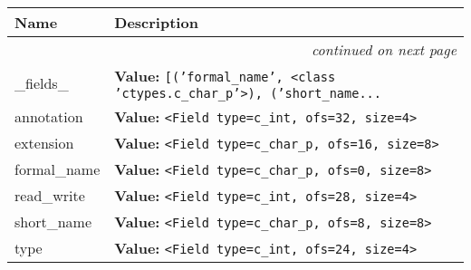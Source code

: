     \vspace{-1cm}
\hspace{\varindent}\begin{longtable}{|p{\varnamewidth}|p{\vardescrwidth}|l}
\cline{1-2}
\cline{1-2} \centering \textbf{Name} & \centering \textbf{Description}& \\
\cline{1-2}
\endhead\cline{1-2}\multicolumn{3}{r}{\small\textit{continued on next page}}\\\endfoot\cline{1-2}
\endlastfoot\raggedright \_\-f\-i\-e\-l\-d\-s\-\_\- & \raggedright \textbf{Value:} 
{\tt \texttt{[}\texttt{(}\texttt{'}\texttt{formal\_name}\texttt{'}\texttt{, }{\textless}class 'ctypes.c\_char\_p'{\textgreater}\texttt{)}\texttt{, }\texttt{(}\texttt{'}\texttt{short\_name}\texttt{...}}&\\
\cline{1-2}
\raggedright a\-n\-n\-o\-t\-a\-t\-i\-o\-n\- & \raggedright \textbf{Value:} 
{\tt {\textless}Field type=c\_int, ofs=32, size=4{\textgreater}}&\\
\cline{1-2}
\raggedright e\-x\-t\-e\-n\-s\-i\-o\-n\- & \raggedright \textbf{Value:} 
{\tt {\textless}Field type=c\_char\_p, ofs=16, size=8{\textgreater}}&\\
\cline{1-2}
\raggedright f\-o\-r\-m\-a\-l\-\_\-n\-a\-m\-e\- & \raggedright \textbf{Value:} 
{\tt {\textless}Field type=c\_char\_p, ofs=0, size=8{\textgreater}}&\\
\cline{1-2}
\raggedright r\-e\-a\-d\-\_\-w\-r\-i\-t\-e\- & \raggedright \textbf{Value:} 
{\tt {\textless}Field type=c\_int, ofs=28, size=4{\textgreater}}&\\
\cline{1-2}
\raggedright s\-h\-o\-r\-t\-\_\-n\-a\-m\-e\- & \raggedright \textbf{Value:} 
{\tt {\textless}Field type=c\_char\_p, ofs=8, size=8{\textgreater}}&\\
\cline{1-2}
\raggedright t\-y\-p\-e\- & \raggedright \textbf{Value:} 
{\tt {\textless}Field type=c\_int, ofs=24, size=4{\textgreater}}&\\
\cline{1-2}
\end{longtable}



